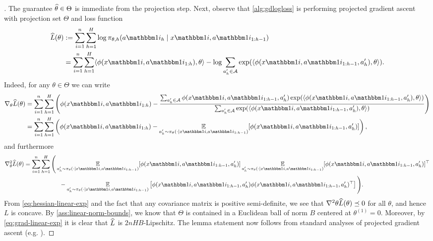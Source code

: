 \begin{proof}[]
The guarantee $\widehat{\theta} \in \Theta$ is immediate from the projection step. Next, observe that \cref{alg:gdlogloss} is performing projected gradient ascent with projection set $\Theta$ and loss function
\begin{align}
\wh L(\theta) 
&:= \sum_{i=1}^n\sum_{h=1}^H \log \pi_{\theta,h}(a\ind{i}_h\mid{}x\ind{i},a\ind{i}_{1:h-1}) \\ 
&= \sum_{i=1}^n\sum_{h=1}^H \langle \phi(x\ind{i},a\ind{i}_{1:h}),\theta\rangle - \log \sum_{a_h'\in\MA} \exp(\langle \phi(x\ind{i},a\ind{i}_{1:h-1},a'_h),\theta\rangle).
\end{align}
Indeed, for any $\theta \in \Theta$ we can write
\begin{align}
\grad_\theta \wh L(\theta) 
&= \sum_{i=1}^n \sum_{h=1}^H \left(\phi(x\ind{i},a\ind{i}_{1:h}) - \frac{\sum_{a_h'\in\MA} \phi(x\ind{i},a\ind{i}_{1:h-1},a'_h) \exp(\langle \phi(x\ind{i},a\ind{i}_{1:h-1},a'_h),\theta\rangle)}{\sum_{a_h'\in\MA} \exp(\langle \phi(x\ind{i},a\ind{i}_{1:h-1},a'_h),\theta\rangle)}\right) \\ 
&= \sum_{i=1}^n \sum_{h=1}^H \left(\phi(x\ind{i},a\ind{i}_{1:h}) - \EE_{a'_h \sim \pi_\theta(\cdot\mid{}x\ind{i},a\ind{i}_{1:h-1})}[\phi(x\ind{i},a\ind{i}_{1:h-1},a'_h)]\right), \label{eq:grad-linear-exp}
\end{align}
and furthermore
\begin{align}
\grad^2_\theta \wh L(\theta) 
&= \sum_{i=1}^n\sum_{h=1}^H\Bigg( \EE_{a'_h \sim \pi_\theta(\cdot\mid{}x\ind{i},a\ind{i}_{1:h-1})}[\phi(x\ind{i},a\ind{i}_{1:h-1},a'_h)]\EE_{a'_h \sim \pi_\theta(\cdot\mid{}x\ind{i},a\ind{i}_{1:h-1})}[\phi(x\ind{i},a\ind{i}_{1:h-1},a'_h)]^\top \\ 
&\qquad\qquad\qquad- \EE_{a'_h \sim \pi_\theta(\cdot\mid{}x\ind{i},a\ind{i}_{1:h-1})}\left[\phi(x\ind{i},a\ind{i}_{1:h-1},a'_h)\phi(x\ind{i},a\ind{i}_{1:h-1},a'_h)^\top\right]\Bigg).\label{eq:hessian-linear-exp}
\end{align}
From \cref{eq:hessian-linear-exp} and the fact that any covariance matrix is positive semi-definite, we see that $\nabla^2\theta \widehat{L}(\theta) \preceq 0$ for all $\theta$, and hence $L$ is concave. By \cref{ass:linear-norm-bounds}, we know that $\Theta$ is contained in a Euclidean ball of norm $B$ centered at $\theta^{(1)} = 0$. Moreover, by \cref{eq:grad-linear-exp} it is clear that $\widehat{L}$ is $2nHB$-Lipschitz. The lemma statement now follows from standard analyses of projected gradient ascent (e.g. \cite[Theorem 3.2]{bubeck2015convex}). 
\end{proof}

